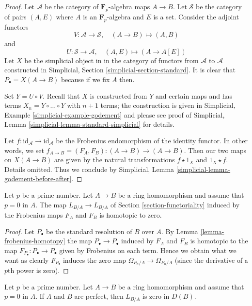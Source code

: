 \begin{proof}
Let $\mathcal{A}$ be the category of $\mathbf{F}_p$-algebra maps
$A \to B$. Let $\mathcal{S}$ be the category of pairs $(A, E)$
where $A$ is an $\mathbf{F}_p$-algebra and $E$ is a set. Consider the
adjoint functors
$$
V : \mathcal{A} \to \mathcal{S}, \quad (A \to B) \mapsto (A, B)
$$
and
$$
U : \mathcal{S} \to \mathcal{A}, \quad (A, E) \mapsto (A \to A[E])
$$
Let $X$ be the simplicial object in 
in the category of functors from $\mathcal{A}$ to $\mathcal{A}$
constructed in Simplicial, Section \ref{simplicial-section-standard}.
It is clear that $P_\bullet = X(A \to B)$ because if we fix
$A$ then.

\medskip\noindent
Set $Y = U \circ V$. Recall that $X$ is constructed from $Y$
and certain maps and has terms $X_n = Y \circ \ldots \circ Y$
with $n + 1$ terms; the construction is given in
Simplicial, Example \ref{simplicial-example-godement} and please see
proof of Simplicial, Lemma \ref{simplicial-lemma-standard-simplicial}
for details.

\medskip\noindent
Let $f : \text{id}_\mathcal{A} \to \text{id}_\mathcal{A}$
be the Frobenius endomorphism of the identity functor.
In other words, we set $f_{A \to B} = (F_A, F_B) : (A \to B) \to (A \to B)$.
Then our two maps on $X(A \to B)$ are given by the natural transformations
$f \star 1_X$ and $1_X \star f$. Details omitted.
Thus we conclude by Simplicial, Lemma
\ref{simplicial-lemma-godement-before-after}.
\end{proof}

\begin{lemma}
\label{lemma-frobenius-acts-as-zero}
Let $p$ be a prime number. Let $A \to B$ be a ring homomorphism
and assume that $p = 0$ in $A$. The map $L_{B/A} \to L_{B/A}$
of Section \ref{section-functoriality} induced by the
Frobenius maps $F_A$ and $F_B$ is homotopic to zero.
\end{lemma}

\begin{proof}
Let $P_\bullet$ be the standard resolution of $B$ over $A$.
By Lemma \ref{lemma-frobenius-homotopy} the map $P_\bullet \to P_\bullet$
induced by $F_A$ and $F_B$ is homotopic to the map
$F_{P_\bullet} : P_\bullet \to P_\bullet$ given by
Frobenius on each term. Hence we obtain what we want as clearly
$F_{P_\bullet}$ induces the zero map $\Omega_{P_n/A} \to \Omega_{P_n/A}$
(since the derivative of a $p$th power is zero).
\end{proof}

\begin{lemma}
\label{lemma-perfect-zero}
Let $p$ be a prime number. Let $A \to B$ be a ring homomorphism
and assume that $p = 0$ in $A$. If $A$ and $B$ are perfect, then
$L_{B/A}$ is zero in $D(B)$.
\end{lemma}

